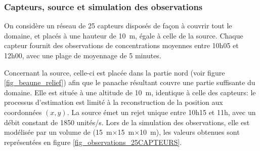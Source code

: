\subsubsection{Capteurs, source et simulation des observations}
On considère un réseau de 25 capteurs disposés de façon à couvrir tout le domaine, et placés à une hauteur de \SI{10}{\meter}, égale à celle de la source. Chaque capteur fournit des observations de concentrations moyennes entre 10h05 et 12h00, avec une plage de moyennage de 5 minutes.

Concernant la source, celle-ci est placée dans la partie nord (voir figure \ref{fig_beaune_relief}) afin que le panache résultant couvre une partie suffisante du domaine. Elle est située à une altitude de \SI{10}{\m}, identique à celle des capteurs: {le processus d'estimation est limité à} la reconstruction de la position aux coordonnées $(x,y)$. La source émet un rejet unique entre 10h15 et 11h, avec un débit constant de 1850 unités/s. {Lors de la simulation des observations, elle est modélisée par un volume de (\SI{15}{\meter}$\times$\SI{15}{\meter}$\times$\SI{10}{\meter}), les valeurs obtenues sont représentées en figure \ref{fig_observations_25CAPTEURS}.}\\



